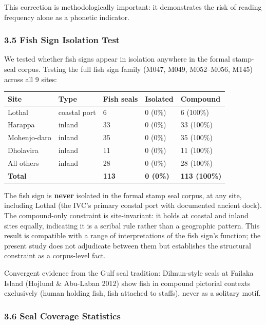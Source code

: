 \documentclass[
]{article}
\newcounter{none} %
\begin{document}
This correction is methodologically important: it demonstrates the risk
of reading frequency alone as a phonetic indicator.

\subsubsection{3.5 Fish Sign Isolation
 Test}\label{fish-sign-isolation-test}

We tested whether fish signs appear in isolation anywhere in the formal stamp-seal corpus.
Testing the full fish sign family (M047, M049, M052--M056, M145) across
all 9 sites:

{\def\LTcaptype{none} %
\begin{longtable}[]{@{}lllll@{}}
\toprule\noalign{}
Site & Type & Fish seals & Isolated & Compound \\
\midrule\noalign{}
\endhead
\bottomrule\noalign{}
\endlastfoot
Lothal & coastal port & 6 & 0 (0\%) & 6 (100\%) \\
Harappa & inland & 33 & 0 (0\%) & 33 (100\%) \\
Mohenjo-daro & inland & 35 & 0 (0\%) & 35 (100\%) \\
Dholavira & inland & 11 & 0 (0\%) & 11 (100\%) \\
All others & inland & 28 & 0 (0\%) & 28 (100\%) \\
\textbf{Total} & & \textbf{113} & \textbf{0 (0\%)} & \textbf{113
(100\%)} \\
\end{longtable}
}

The fish sign is \textbf{never} isolated in the formal stamp seal
corpus, at any site, including Lothal (the IVC's primary coastal port
with documented ancient dock). The compound-only constraint is
site-invariant: it holds at coastal and inland sites equally, indicating
it is a scribal rule rather than a geographic pattern. This result is
compatible with a range of interpretations of the fish sign's function;
the present study does not adjudicate between them but establishes the
structural constraint as a corpus-level fact.

Convergent evidence from the Gulf seal tradition: Dilmun-style seals at
Failaka Island (Hojlund \& Abu-Laban 2012) show fish in compound
pictorial contexts exclusively (human holding fish, fish attached to
staffs), never as a solitary motif.

\subsubsection{3.6 Seal Coverage
Statistics}\label{seal-coverage-statistics}
\end{document}
